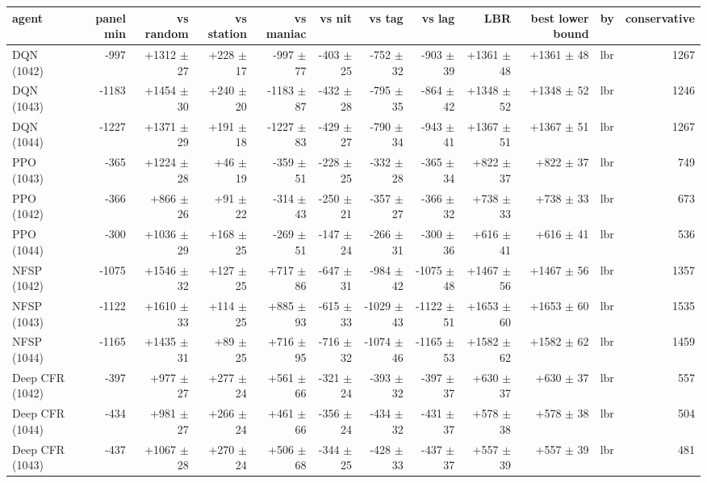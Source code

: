 \begin{tabular}{lrrrrrrrrrrr}
\toprule
agent & panel min & vs random & vs station & vs maniac & vs nit & vs tag & vs lag & LBR & best lower bound & by & conservative \\
\midrule
DQN (1042) & -997 & +1312 $\pm$ 27 & +228 $\pm$ 17 & -997 $\pm$ 77 & -403 $\pm$ 25 & -752 $\pm$ 32 & -903 $\pm$ 39 & +1361 $\pm$ 48 & +1361 $\pm$ 48 & lbr & 1267 \\
DQN (1043) & -1183 & +1454 $\pm$ 30 & +240 $\pm$ 20 & -1183 $\pm$ 87 & -432 $\pm$ 28 & -795 $\pm$ 35 & -864 $\pm$ 42 & +1348 $\pm$ 52 & +1348 $\pm$ 52 & lbr & 1246 \\
DQN (1044) & -1227 & +1371 $\pm$ 29 & +191 $\pm$ 18 & -1227 $\pm$ 83 & -429 $\pm$ 27 & -790 $\pm$ 34 & -943 $\pm$ 41 & +1367 $\pm$ 51 & +1367 $\pm$ 51 & lbr & 1267 \\
PPO (1043) & -365 & +1224 $\pm$ 28 & +46 $\pm$ 19 & -359 $\pm$ 51 & -228 $\pm$ 25 & -332 $\pm$ 28 & -365 $\pm$ 34 & +822 $\pm$ 37 & +822 $\pm$ 37 & lbr & 749 \\
PPO (1042) & -366 & +866 $\pm$ 26 & +91 $\pm$ 22 & -314 $\pm$ 43 & -250 $\pm$ 21 & -357 $\pm$ 27 & -366 $\pm$ 32 & +738 $\pm$ 33 & +738 $\pm$ 33 & lbr & 673 \\
PPO (1044) & -300 & +1036 $\pm$ 29 & +168 $\pm$ 25 & -269 $\pm$ 51 & -147 $\pm$ 24 & -266 $\pm$ 31 & -300 $\pm$ 36 & +616 $\pm$ 41 & +616 $\pm$ 41 & lbr & 536 \\
NFSP (1042) & -1075 & +1546 $\pm$ 32 & +127 $\pm$ 25 & +717 $\pm$ 86 & -647 $\pm$ 31 & -984 $\pm$ 42 & -1075 $\pm$ 48 & +1467 $\pm$ 56 & +1467 $\pm$ 56 & lbr & 1357 \\
NFSP (1043) & -1122 & +1610 $\pm$ 33 & +114 $\pm$ 25 & +885 $\pm$ 93 & -615 $\pm$ 33 & -1029 $\pm$ 43 & -1122 $\pm$ 51 & +1653 $\pm$ 60 & +1653 $\pm$ 60 & lbr & 1535 \\
NFSP (1044) & -1165 & +1435 $\pm$ 31 & +89 $\pm$ 25 & +716 $\pm$ 95 & -716 $\pm$ 32 & -1074 $\pm$ 46 & -1165 $\pm$ 53 & +1582 $\pm$ 62 & +1582 $\pm$ 62 & lbr & 1459 \\
Deep CFR (1042) & -397 & +977 $\pm$ 27 & +277 $\pm$ 24 & +561 $\pm$ 66 & -321 $\pm$ 24 & -393 $\pm$ 32 & -397 $\pm$ 37 & +630 $\pm$ 37 & +630 $\pm$ 37 & lbr & 557 \\
Deep CFR (1044) & -434 & +981 $\pm$ 27 & +266 $\pm$ 24 & +461 $\pm$ 66 & -356 $\pm$ 24 & -434 $\pm$ 32 & -431 $\pm$ 37 & +578 $\pm$ 38 & +578 $\pm$ 38 & lbr & 504 \\
Deep CFR (1043) & -437 & +1067 $\pm$ 28 & +270 $\pm$ 24 & +506 $\pm$ 68 & -344 $\pm$ 25 & -428 $\pm$ 33 & -437 $\pm$ 37 & +557 $\pm$ 39 & +557 $\pm$ 39 & lbr & 481 \\

\end{tabular}
